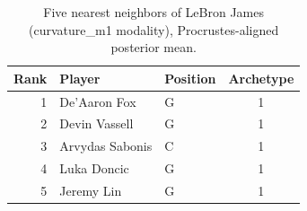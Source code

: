 \begin{table}[htbp]
  \centering\small
  \begin{tabular}{rllc}
    \toprule
    Rank & Player & Position & Archetype \\
    \midrule
    1 & De'Aaron Fox & G & 1 \\
    2 & Devin Vassell & G & 1 \\
    3 & Arvydas Sabonis & C & 1 \\
    4 & Luka Doncic & G & 1 \\
    5 & Jeremy Lin & G & 1 \\
    \bottomrule
  \end{tabular}
  \caption{Five nearest neighbors of LeBron James (curvature_m1 modality), Procrustes-aligned posterior mean.}
  \label{tab:LeBron_James_neighbors_curvature_m1}
\end{table}

